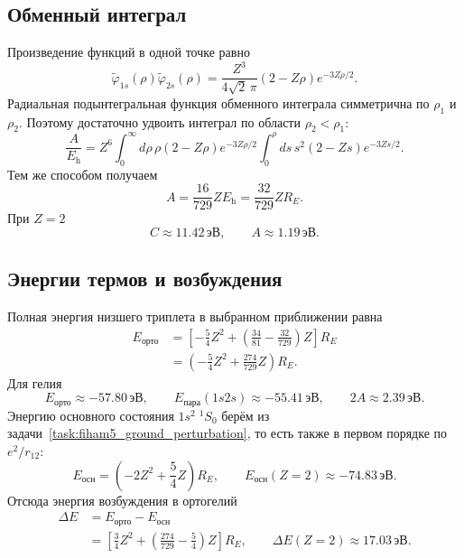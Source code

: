 \documentclass[../final.tex]{subfiles}
\begin{document}
\subsection*{Обменный интеграл}

Произведение функций в одной точке равно
\[
    \widetilde\varphi_{1s}(\rho)\widetilde\varphi_{2s}(\rho)
       =\frac{Z^3}{4\sqrt2\,\pi}(2-Z\rho)e^{-3Z\rho/2}.
\]
Радиальная подынтегральная функция обменного интеграла симметрична
по $\rho_1$ и $\rho_2$. Поэтому достаточно удвоить интеграл по области
$\rho_2<\rho_1$:
\[
    \frac A{E_{\mathrm h}}
      =Z^6\int_0^\infty d\rho\,\rho(2-Z\rho)e^{-3Z\rho/2}
         \int_0^\rho ds\,s^2(2-Zs)e^{-3Zs/2}.
\]
Тем же способом получаем
\[
    A=\frac{16}{729}ZE_{\mathrm h}=\frac{32}{729}ZR_E.
\]
При $Z=2$
\[
    C\approx11.42\,\text{эВ},\qquad A\approx1.19\,\text{эВ}.
\]

\subsection*{Энергии термов и возбуждения}

Полная энергия низшего триплета в выбранном приближении равна
\begin{align*}
    E_{\text{орто}}
       &=\left[-\frac54Z^2+
             \left(\frac{34}{81}-\frac{32}{729}\right)Z\right]R_E\\
       &=\left(-\frac54Z^2+\frac{274}{729}Z\right)R_E.
\end{align*}
Для гелия
\[
    E_{\text{орто}}\approx-57.80\,\text{эВ},\qquad
    E_{\text{пара}}(1s2s)\approx-55.41\,\text{эВ},\qquad
    2A\approx2.39\,\text{эВ}.
\]
Энергию основного состояния $1s^2\;{}^1S_0$ берём
из задачи~\ref{task:fiham5_ground_perturbation}, то есть также
в первом порядке по $e^2/r_{12}$:
\[
    E_{\text{осн}}=\left(-2Z^2+\frac54Z\right)R_E,
    \qquad E_{\text{осн}}(Z=2)\approx-74.83\,\text{эВ}.
\]
Отсюда энергия возбуждения в ортогелий
\begin{align*}
    \Delta E&=E_{\text{орто}}-E_{\text{осн}}\\
       &=\left[\frac34Z^2+
          \left(\frac{274}{729}-\frac54\right)Z\right]R_E,
    \qquad \Delta E(Z=2)\approx17.03\,\text{эВ}.
\end{align*}
\end{document}
